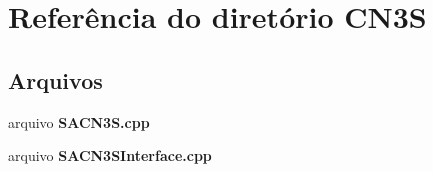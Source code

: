 \section{Referência do diretório C\+N3S}
\label{dir_383a8c8428bc970eb66814bea0965a49}
\subsection*{Arquivos}
\begin{DoxyCompactItemize}
\item 
arquivo {\bf S\+A\+C\+N3\+S.\+cpp}
\item 
arquivo {\bf S\+A\+C\+N3\+S\+Interface.\+cpp}
\end{DoxyCompactItemize}
